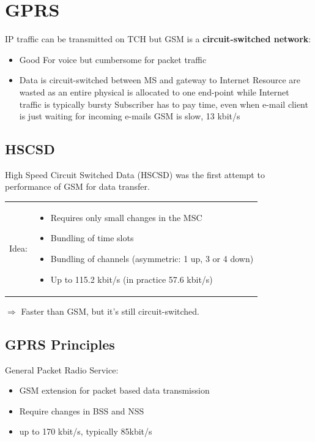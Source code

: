 \section{GPRS}

IP traffic can be transmitted on TCH but GSM is a \textbf{circuit-switched network}:
\begin{itemize}
	\item Good For voice but cumbersome for packet traffic
	\item Data is circuit-switched between MS and gateway to Internet
        \consitem{} Resource are wasted as an entire physical is allocated to one end-point
	while Internet traffic is typically bursty
    \consitem{} Subscriber has to pay time, even when e-mail client is just waiting
	for incoming e-mails
    \consitem{} GSM is slow, 13 kbit/s
\end{itemize}

\subsection{HSCSD}

High Speed Circuit Switched Data (HSCSD) was the first attempt to performance
of GSM for data transfer. 

\begin{tabular}{lm{10cm}}
    Idea:&
\begin{itemize}
	\item Requires only small changes in the MSC
	\item Bundling of time slots
	\item Bundling of channels (asymmetric: 1 up, 3 or 4 down)
	\item Up to 115.2 kbit/s (in practice 57.6 kbit/s)
\end{itemize}
\end{tabular}

$\Rightarrow$ Faster than GSM, but it's still circuit-switched.

\subsection{GPRS Principles}
General Packet Radio Service:
\begin{itemize}
	\item GSM extension for packet based data transmission
	\item Require changes in BSS and NSS
	\item up to 170 kbit/s, typically 85kbit/s
\end{itemize}

